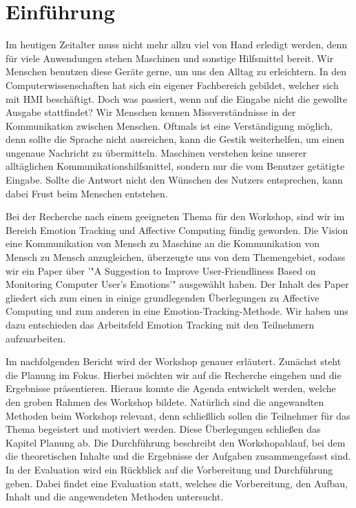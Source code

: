 \section{Einführung}

Im heutigen Zeitalter muss nicht mehr allzu viel von Hand erledigt werden, denn für viele Anwendungen stehen Maschinen und sonstige Hilfsmittel bereit. Wir Menschen benutzen diese Geräte gerne, um uns den Alltag zu erleichtern. In den Computerwissenschaften hat sich ein eigener Fachbereich gebildet, welcher sich mit \ac{HMI} beschäftigt. Doch was passiert, wenn auf die Eingabe nicht die gewollte Ausgabe stattfindet? Wir Menschen kennen Missverständnisse in der Kommunikation zwischen Menschen. Oftmals ist eine Verständigung möglich, denn sollte die Sprache nicht ausreichen, kann die Gestik weiterhelfen, um einen ungenaue Nachricht zu übermitteln. Maschinen verstehen keine unserer alltäglichen Kommunikationshilfsmittel, sondern nur die vom Benutzer getätigte Eingabe. Sollte die Antwort nicht den Wünschen des Nutzers entsprechen, kann dabei Frust beim Menschen entstehen. 


Bei der Recherche nach einem geeigneten Thema für den Workshop, sind wir im Bereich Emotion Tracking und Affective Computing fündig geworden. Die Vision eine Kommunikation von Mensch zu Maschine an die Kommunikation von Mensch zu Mensch anzugleichen, überzeugte uns von dem Themengebiet, sodass wir ein Paper über '"A Suggestion to Improve User-Friendliness Based on Monitoring Computer User’s Emotions'" ausgewählt haben. Der Inhalt des Paper gliedert sich zum einen in einige grundlegenden Überlegungen zu Affective Computing und zum anderen in eine Emotion-Tracking-Methode. Wir haben uns dazu entschieden das Arbeitsfeld Emotion Tracking mit den Teilnehmern aufzuarbeiten.


Im nachfolgenden Bericht wird der Workshop genauer erläutert. Zunächst steht die Planung im Fokus. Hierbei möchten wir auf die Recherche eingehen und die Ergebnisse präsentieren. Hieraus konnte die Agenda entwickelt werden, welche den groben Rahmen des Workshop bildete. Natürlich sind die angewandten Methoden beim Workshop relevant, denn schließlich sollen die Teilnehmer für das Thema begeistert und motiviert werden.
Diese Überlegungen schließen das Kapitel Planung ab. Die Durchführung beschreibt den Workshopablauf, bei dem die theoretischen Inhalte und die Ergebnisse der Aufgaben zusammengefasst sind. In der Evaluation wird ein Rückblick auf die Vorbereitung und Durchführung geben. Dabei findet eine Evaluation statt, welches die Vorbereitung, den Aufbau, Inhalt und die angewendeten Methoden untersucht. 
